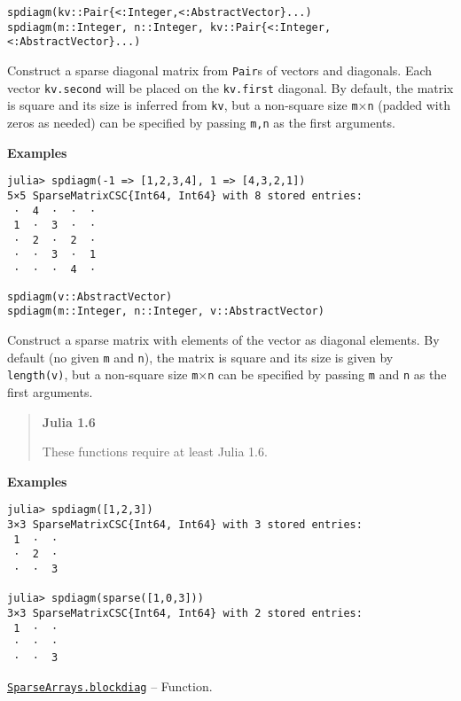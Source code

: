 \begin{adjustwidth}{2em}{0pt}


\begin{verbatim}
spdiagm(kv::Pair{<:Integer,<:AbstractVector}...)
spdiagm(m::Integer, n::Integer, kv::Pair{<:Integer,<:AbstractVector}...)
\end{verbatim}

Construct a sparse diagonal matrix from \texttt{Pair}s of vectors and diagonals. Each vector \texttt{kv.second} will be placed on the \texttt{kv.first} diagonal.  By default, the matrix is square and its size is inferred from \texttt{kv}, but a non-square size \texttt{m}×\texttt{n} (padded with zeros as needed) can be specified by passing \texttt{m,n} as the first arguments.

\textbf{Examples}


\begin{verbatim}
julia> spdiagm(-1 => [1,2,3,4], 1 => [4,3,2,1])
5×5 SparseMatrixCSC{Int64, Int64} with 8 stored entries:
 ⋅  4  ⋅  ⋅  ⋅
 1  ⋅  3  ⋅  ⋅
 ⋅  2  ⋅  2  ⋅
 ⋅  ⋅  3  ⋅  1
 ⋅  ⋅  ⋅  4  ⋅
\end{verbatim}




\begin{lstlisting}
spdiagm(v::AbstractVector)
spdiagm(m::Integer, n::Integer, v::AbstractVector)
\end{lstlisting}

Construct a sparse matrix with elements of the vector as diagonal elements. By default (no given \texttt{m} and \texttt{n}), the matrix is square and its size is given by \texttt{length(v)}, but a non-square size \texttt{m}×\texttt{n} can be specified by passing \texttt{m} and \texttt{n} as the first arguments.

\begin{quote}
\textbf{Julia 1.6}

These functions require at least Julia 1.6.

\end{quote}
\textbf{Examples}


\begin{verbatim}
julia> spdiagm([1,2,3])
3×3 SparseMatrixCSC{Int64, Int64} with 3 stored entries:
 1  ⋅  ⋅
 ⋅  2  ⋅
 ⋅  ⋅  3

julia> spdiagm(sparse([1,0,3]))
3×3 SparseMatrixCSC{Int64, Int64} with 2 stored entries:
 1  ⋅  ⋅
 ⋅  ⋅  ⋅
 ⋅  ⋅  3
\end{verbatim}



\end{adjustwidth}
\hypertarget{12222128005156653307}{}
\hyperlink{12222128005156653307}{\texttt{SparseArrays.blockdiag}}  -- {Function.}

